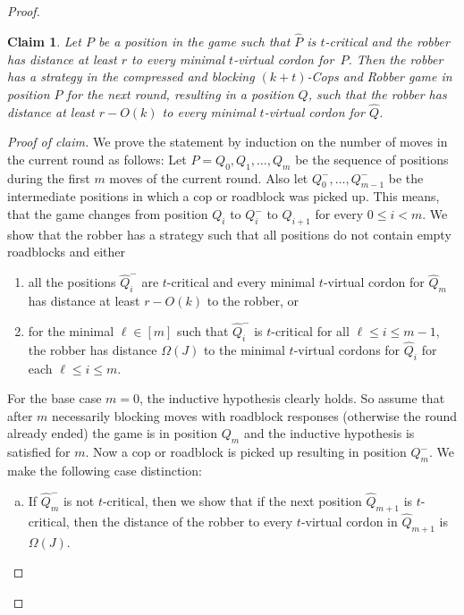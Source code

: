 \documentclass[10pt,a4paper]{article}
\newtheorem{claim}[theorem]{Claim}
\newenvironment{claimproof}{\begin{proof}[Proof of claim]}{\end{proof}}
\begin{document}
\begin{proof}
	\begin{claim}
		\label{clm:only-constant-rows-per-round}
		Let $P$ be a position in the game such that $\hat{P}$ is $t$-critical
		and the robber 
		has distance at least $r$ to every 
		minimal $t$-virtual cordon for~$\hat{P}$.
		Then the robber has a strategy in the compressed and blocking $(k+t)$-Cops and Robber game in position $P$
		for the next round, resulting in a position $Q$,
		such that the robber has distance at least $r-O(k)$ to every minimal $t$-virtual cordon for $\hat{Q}$.
	\end{claim}
	\begin{claimproof}
		We prove the statement by induction on the number of moves in the current round as follows:
		Let $P=Q_0, Q_1, \dots ,Q_m$ be the sequence of positions during the first $m$ moves of the current round.
		Also let $Q_0^-, \dots, Q_{m-1}^-$ be the intermediate positions in which a cop or roadblock was picked up.
		This means, that the game changes from position $Q_i$ to $Q_i^-$ to $Q_{i+1}$ for every $0 \leq i < m$.
		We show that the robber has a strategy such that all positions do not contain empty roadblocks and either
		\begin{enumerate}
			\item all the positions $\hat{Q}_i^-$ are $t$-critical and
			every minimal $t$-virtual cordon for $\hat{Q}_m$ has distance at least $r-O(k)$ to the robber, or
			\item for the minimal $\ell \in [m]$ such that $\hat{Q}_i^-$
			is $t$-critical for all $\ell\leq i \leq m-1$, the robber has distance $\Omega(J)$ to
			the minimal $t$-virtual cordons for $\hat{Q}_i$
			for each $\ell\leq i \leq m$.
		\end{enumerate}
		For the base case $m=0$,
		the inductive hypothesis clearly holds.
		So assume that after $m$ necessarily blocking moves with roadblock responses (otherwise the round already ended)
		the game is in position $Q_m$
		and the inductive hypothesis is satisfied for $m$.
		Now a cop or roadblock is picked up resulting in
		position $Q_m^-$.
		We make the following case distinction:
		\begin{enumerate}[(a)]
			\item If $\hat{Q}_m^-$ is not $t$-critical,
			then we show that if the next position $\hat{Q}_{m+1}$
			 is $t$-critical, then
			the distance of the robber to every $t$-virtual cordon in $\hat{Q}_{m+1}$ is $\Omega(J)$. 
			

\end{enumerate}
\end{claimproof}
\end{proof}
\end{document}
